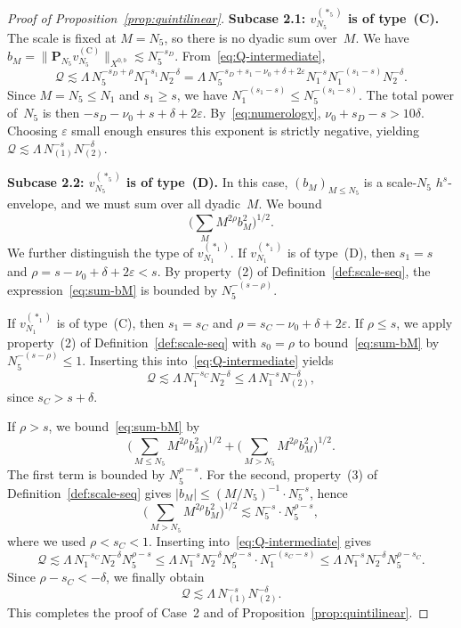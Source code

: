 \documentclass[11pt,reqno,english]{amsart}
\numberwithin{equation}{section}
\theoremstyle{plain}
\theoremstyle{definition}
\theoremstyle{remark}
\renewcommand{\epsilon}{\varepsilon}
\begin{document}
\begin{proof}[Proof of Proposition~\ref{prop:quintilinear}]
\smallskip\noindent
\textbf{Subcase 2.1: $v_{N_5}^{(\ast_5)}$ is of type~(C).}
The scale is fixed at $M = N_5$, so there is no dyadic sum over~$M$. We have $b_M = \|\mathbf{P}_{N_5} v_{N_5}^{(\mathrm{C})}\|_{X^{0,b}} \lesssim N_5^{-s_D}$. From~\eqref{eq:Q-intermediate},
\[
\mathcal{Q} \lesssim \Lambda\, N_5^{-s_D+\rho} N_1^{-s_1} N_2^{-\delta} = \Lambda\, N_5^{-s_D + s_1 - \nu_0 + \delta + 2\epsilon} N_1^{-s} N_1^{-(s_1 - s)} N_2^{-\delta}.
\]
Since $M = N_5 \le N_1$ and $s_1 \ge s$, we have $N_1^{-(s_1 - s)} \le N_5^{-(s_1 - s)}$. The total power of~$N_5$ is then $-s_D - \nu_0 + s + \delta + 2\epsilon$.
By~\eqref{eq:numerology}, $\nu_0 + s_D - s > 10\delta$. Choosing $\epsilon$ small enough ensures this exponent is strictly negative, yielding $\mathcal{Q} \lesssim \Lambda\, N_{(1)}^{-s} N_{(2)}^{-\delta}$.

\smallskip\noindent
\textbf{Subcase 2.2: $v_{N_5}^{(\ast_5)}$ is of type~(D).}
In this case, $(b_M)_{M \le N_5}$ is a scale-$N_5$ $h^s$-envelope, and we must sum over all dyadic~$M$. We bound
\begin{equation}\label{eq:sum-bM}
	\Big(\sum_{M} M^{2\rho} b_M^2\Big)^{1/2}.
\end{equation}
We further distinguish the type of $v_{N_1}^{(\ast_1)}$. If $v_{N_1}^{(\ast_1)}$ is of type~(D), then $s_1=s$ and $\rho=s-\nu_0+\delta+2\epsilon<s$. By property~(2) of Definition~\ref{def:scale-seq}, the expression~\eqref{eq:sum-bM} is bounded by $N_5^{-(s-\rho)}$.

If $v_{N_1}^{(\ast_1)}$ is of type~(C), then $s_1=s_C$ and $\rho=s_C-\nu_0+\delta+2\epsilon$. If $\rho\leq s$, we apply property~(2) of Definition~\ref{def:scale-seq} with $s_0=\rho$ to bound~\eqref{eq:sum-bM} by $N_5^{-(s-\rho)}\leq 1$. Inserting this into~\eqref{eq:Q-intermediate} yields
\[
\mathcal{Q}\lesssim \Lambda\, N_1^{-s_C}N_2^{-\delta}\leq \Lambda\, N_1^{-s}N_{(2)}^{-\delta},
\]
since $s_C>s+\delta$.

If $\rho>s$, we bound~\eqref{eq:sum-bM} by
\[
\Big(\sum_{M\leq N_5}M^{2\rho}b_M^2\Big)^{1/2}+\Big(\sum_{M>N_5}M^{2\rho}b_M^2\Big)^{1/2}.
\]
The first term is bounded by $N_5^{\rho-s}$. For the second, property~(3) of Definition~\ref{def:scale-seq} gives $|b_M|\leq (M/N_5)^{-1}\cdot N_5^{-s}$, hence
\[
\Big(\sum_{M>N_5}M^{2\rho} b_M^2\Big)^{1/2}\lesssim N_5^{-s}\cdot N_5^{\rho-s},
\]
where we used $\rho<s_C<1$. Inserting into~\eqref{eq:Q-intermediate} gives
\[
\mathcal{Q}\lesssim \Lambda\, N_1^{-s_C}N_2^{-\delta}N_5^{\rho-s}\leq \Lambda\, N_1^{-s}N_2^{-\delta}N_5^{\rho-s}\cdot N_1^{-(s_C-s)}\leq \Lambda\, N_1^{-s}N_2^{-\delta}N_5^{\rho-s_C}.
\]
Since $\rho-s_C<-\delta$, we finally obtain
\[
\mathcal{Q}\lesssim \Lambda\, N_{(1)}^{-s}N_{(2)}^{-\delta}.
\]
This completes the proof of Case~2 and of Proposition~\ref{prop:quintilinear}.
\end{proof}
	
\end{document}

